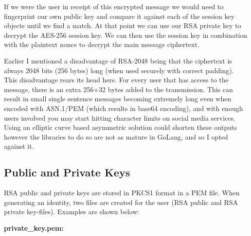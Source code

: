 \documentclass{article}[12pt]
\begin{document}
		If we were the user in receipt of this encrypted message we would need to fingerprint our own public key and compare it against each of the session key objects until we find a match. At that point we can use our RSA private key to decrypt the AES-256 session key. We can then use the session key in combination with the plaintext nonce to decrypt the main message ciphertext.
		
		Earlier I mentioned a disadvantage of RSA-2048 being that the ciphertext is always 2048 bits (256 bytes) long (when used securely with correct padding). This disadvantage rears its head here. For every user that has access to the message, there is an extra 256+32 bytes added to the transmission. This can result in small single sentence messages becoming extremely long even when encoded with ASN.1/PEM (which results in base64 encoding), and with enough users involved you may start hitting character limits on social media services. Using an elliptic curve based asymmetric solution could shorten these outputs however the libraries to do so are not as mature in GoLang, and so I opted against it.
		\newpage
		
	\subsection{Public and Private Keys}
		RSA public and private keys are stored in PKCS1 format in a PEM file. When generating an identity, two files are created for the user (RSA public and RSA private key-files). Examples are shown below:
		
		\textbf{private\_key.pem:}
		
\end{document}
